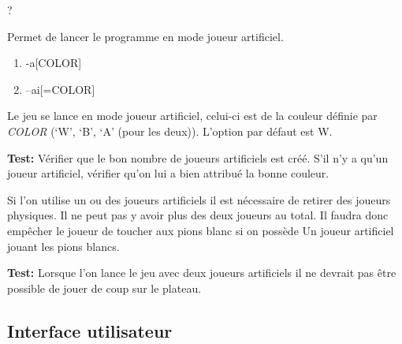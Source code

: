 \documentclass{article}
\begin{document}
\begin{needbox}
    ?
\end{needbox}

\begin{needbox}[F23: Mode IA]
    Permet de lancer le programme en mode joueur artificiel.
    \begin{subneedbox}
        \begin{enumerate}
            \item -a[COLOR]
            \item --ai[=COLOR]
        \end{enumerate}
        Le jeu se lance en mode joueur artificiel, celui-ci est de la couleur
        définie par \textit{COLOR} (`W', `B', `A' (pour les deux)). L'option 
        par défaut est W.

        \textbf{Test:} Vérifier que le bon nombre de joueurs artificiels est créé. 
        S'il n'y a qu'un joueur artificiel, vérifier qu'on lui a bien attribué la bonne
        couleur.
    \end{subneedbox}
    \begin{subneedbox}
        Si l'on utilise un ou des joueurs artificiels il est nécessaire de retirer
        des joueurs physiques. Il ne peut pas y avoir plus des deux joueurs au total.
        Il faudra donc empêcher le joueur de toucher aux pions blanc si on possède Un
        joueur artificiel jouant les pions blancs.

        \textbf{Test:} Lorsque l'on lance le jeu avec deux joueurs artificiels il ne 
        devrait pas être possible de jouer de coup sur le plateau.
    \end{subneedbox}
\end{needbox}

\subsection{Interface utilisateur}
\end{document}
